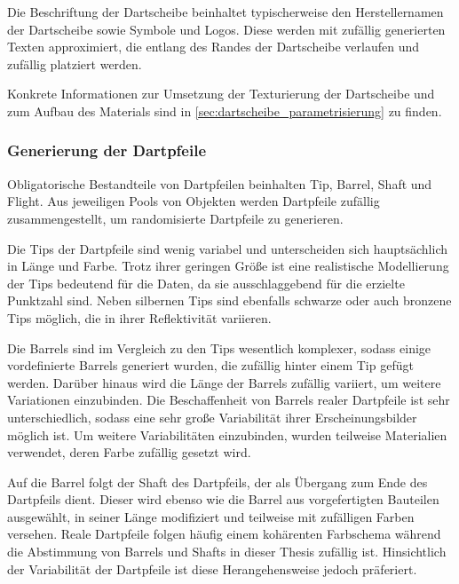Die Beschriftung der Dartscheibe beinhaltet typischerweise den Herstellernamen der Dartscheibe sowie Symbole und Logos. Diese werden mit zufällig generierten Texten approximiert, die entlang des Randes der Dartscheibe verlaufen und zufällig platziert werden.

Konkrete Informationen zur Umsetzung der Texturierung der Dartscheibe und zum Aufbau des Materials sind in \autoref{sec:dartscheibe_parametrisierung} zu finden.

\subsubsection{Generierung der Dartpfeile}

Obligatorische Bestandteile von Dartpfeilen beinhalten Tip, Barrel, Shaft und Flight. Aus jeweiligen Pools von Objekten werden Dartpfeile zufällig zusammengestellt, um randomisierte Dartpfeile zu generieren.

Die Tips der Dartpfeile sind wenig variabel und unterscheiden sich hauptsächlich in Länge und Farbe. Trotz ihrer geringen Größe ist eine realistische Modellierung der Tips bedeutend für die Daten, da sie ausschlaggebend für die erzielte Punktzahl sind. Neben silbernen Tips sind ebenfalls schwarze oder auch bronzene Tips möglich, die in ihrer Reflektivität variieren.

Die Barrels sind im Vergleich zu den Tips wesentlich komplexer, sodass einige vordefinierte Barrels generiert wurden, die zufällig hinter einem Tip gefügt werden. Darüber hinaus wird die Länge der Barrels zufällig variiert, um weitere Variationen einzubinden. Die Beschaffenheit von Barrels realer Dartpfeile ist sehr unterschiedlich, sodass eine sehr große Variabilität ihrer Erscheinungsbilder möglich ist. Um weitere Variabilitäten einzubinden, wurden teilweise Materialien verwendet, deren Farbe zufällig gesetzt wird.

Auf die Barrel folgt der Shaft des Dartpfeils, der als Übergang zum Ende des Dartpfeils dient. Dieser wird ebenso wie die Barrel aus vorgefertigten Bauteilen ausgewählt, in seiner Länge modifiziert und teilweise mit zufälligen Farben versehen. Reale Dartpfeile folgen häufig einem kohärenten Farbschema während die Abstimmung von Barrels und Shafts in dieser Thesis zufällig ist. Hinsichtlich der Variabilität der Dartpfeile ist diese Herangehensweise jedoch präferiert.

